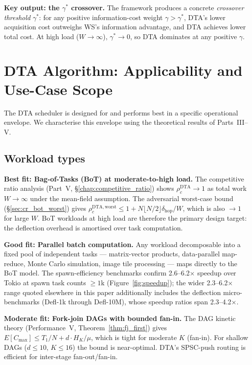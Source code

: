 \documentclass[11pt,a4paper]{article}
\begin{document}
\medskip
\noindent\textbf{Key output: the $\gamma^*$ crossover.}
The framework produces a concrete \emph{crossover threshold} $\gamma^*$:
for any positive information-cost weight $\gamma > \gamma^*$, DTA's lower
acquisition cost outweighs WS's information advantage, and DTA achieves
lower total cost.  At high load ($W \to \infty$), $\gamma^* \to 0$, so
DTA dominates at any positive $\gamma$.

\section{DTA Algorithm: Applicability and Use-Case Scope}
\label{sec:dta_scope}

The DTA scheduler is designed for and performs best in a specific
operational envelope.  We characterise this envelope using the
theoretical results of Parts~III--V.

\subsection{Workload types}

\medskip
\noindent\textbf{Best fit: Bag-of-Tasks (BoT) at moderate-to-high load.}
The competitive ratio analysis (Part~V, \S\ref{chap:competitive_ratio}) shows
$\rho_c^{\mathrm{DTA}} \to 1$ as total work $W \to \infty$ under the
mean-field assumption.  The adversarial worst-case bound
(\S\ref{sec:cr_bot_worst}) gives $\rho_c^{\mathrm{DTA,worst}} \leq
1 + N\lfloor N/2\rfloor\delta_{\mathrm{hop}}/W$, which is also $\to 1$
for large $W$.  BoT workloads at high load are therefore the primary
design target: the deflection overhead is amortised over task computation.

\medskip
\noindent\textbf{Good fit: Parallel batch computation.}
Any workload decomposable into a fixed pool of independent tasks
--- matrix-vector products, data-parallel map-reduce, Monte Carlo
simulation, image tile processing --- maps directly to the BoT model.
The spawn-efficiency benchmarks confirm 2.6--6.2$\times$ speedup over
Tokio at spawn task counts $\geq 1$k (Figure~\ref{fig:speedup}); the
wider 2.3--6.2$\times$ range quoted elsewhere in this paper additionally
includes the deflection micro-benchmarks (Defl-1k through Defl-10M),
whose speedup ratios span 2.3--4.2$\times$.

\medskip
\noindent\textbf{Moderate fit: Fork-join DAGs with bounded fan-in.}
The DAG kinetic theory (Performance~V, Theorem~\ref{thm:fj_first})
gives $E[C_{\max}] \leq T_1/N + d \cdot H_K/\mu$, which is tight
for moderate $K$ (fan-in).  For shallow DAGs ($d \leq 10$, $K \leq 16$)
the bound is near-optimal.  DTA's SPSC-push routing is efficient for
inter-stage fan-out/fan-in.
\end{document}

